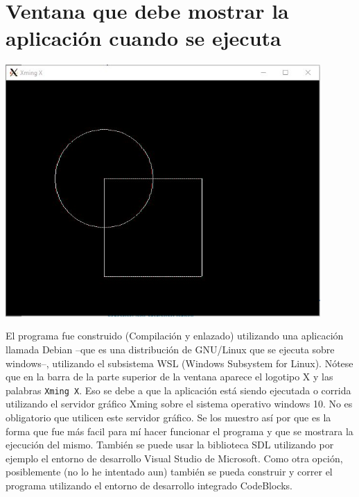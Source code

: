 \documentclass[11pt]{article}
\begin{document}
\section*{Ventana que debe mostrar la aplicaci\'{o}n cuando se ejecuta}
\begin{center}
\includegraphics[width=12cm]{images/Salidabasica.JPG}
\end{center}
El programa fue construido (Compilaci\'{o}n y enlazado) utilizando una aplicaci\'{o}n 
llamada Debian --que es una distribuci\'{o}n de GNU/Linux que se ejecuta sobre windows--, 
utilizando el subsistema WSL (Windows Subsystem for Linux). N\'{o}tese que en la barra 
de la parte superior de la ventana aparece el logotipo X y las palabras {\tt Xming X}. 
Eso se debe a que la aplicaci\'{o}n est\'{a} siendo ejecutada o corrida utilizando el 
servidor gr\'{a}fico Xming sobre el sistema o\-pe\-ra\-ti\-vo windows 10. No es 
obligatorio que utilicen este servidor gr\'{a}fico. Se los muestro as\'{i} por que es 
la forma que fue m\'{a}s facil para m\'{i} hacer funcionar el programa y que se mostrara 
la ejecuci\'{o}n del mismo. Tambi\'{e}n se puede usar la biblioteca SDL utilizando por 
ejemplo el entorno de desarrollo Visual Studio de Microsoft. Como otra opci\'{o}n, 
posiblemente (no lo he intentado aun) tambi\'{e}n se pueda construir y correr el programa 
utilizando el entorno de desarrollo integrado CodeBlocks.
\end{document}
